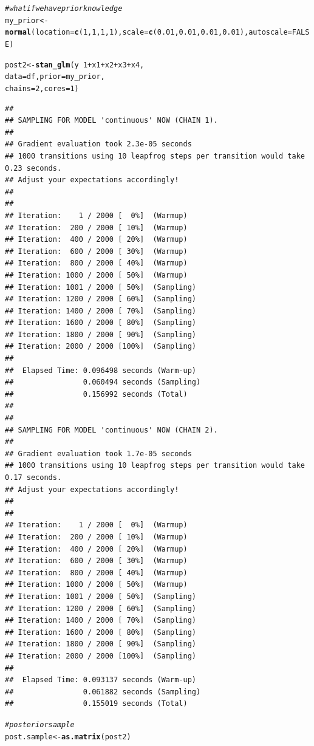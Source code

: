 \documentclass[11pt,a4paper,twoside]{book}\usepackage[]{graphicx}\usepackage[]{color}
\makeatletter
\newcommand{\hlnum}[1]{\textcolor[rgb]{0.686,0.059,0.569}{#1}}%
\newcommand{\hlcom}[1]{\textcolor[rgb]{0.678,0.584,0.686}{\textit{#1}}}%
\newcommand{\hlopt}[1]{\textcolor[rgb]{0,0,0}{#1}}%
\newcommand{\hlstd}[1]{\textcolor[rgb]{0.345,0.345,0.345}{#1}}%
\newcommand{\hlkwb}[1]{\textcolor[rgb]{0.69,0.353,0.396}{#1}}%
\newcommand{\hlkwc}[1]{\textcolor[rgb]{0.333,0.667,0.333}{#1}}%
\newcommand{\hlkwd}[1]{\textcolor[rgb]{0.737,0.353,0.396}{\textbf{#1}}}%
\newenvironment{kframe}{%
 \def\at@end@of@kframe{}%
 \ifinner\ifhmode%
  \def\at@end@of@kframe{\end{minipage}}%
  \begin{minipage}{\columnwidth}%
 \fi\fi%
 \def\FrameCommand##1{\hskip\@totalleftmargin \hskip-\fboxsep
 \colorbox{shadecolor}{##1}\hskip-\fboxsep
     \hskip-\linewidth \hskip-\@totalleftmargin \hskip\columnwidth}%
 \MakeFramed {\advance\hsize-\width
   \@totalleftmargin\z@ \linewidth\hsize
   \@setminipage}}%
 {\par\unskip\endMakeFramed%
 \at@end@of@kframe}
\newenvironment{knitrout}{}{} %
\makeatother
\begin{document}
\begin{knitrout}
\begin{kframe}
\begin{alltt}
\hlcom{#what if we have prior knowledge}
\hlstd{my_prior} \hlkwb{<-} \hlkwd{normal}\hlstd{(}\hlkwc{location} \hlstd{=} \hlkwd{c}\hlstd{(}\hlnum{1}\hlstd{,} \hlnum{1}\hlstd{,}\hlnum{1}\hlstd{,}\hlnum{1}\hlstd{),} \hlkwc{scale} \hlstd{=} \hlkwd{c}\hlstd{(}\hlnum{0.01}\hlstd{,} \hlnum{0.01}\hlstd{,}\hlnum{0.01}\hlstd{,}\hlnum{0.01}\hlstd{),} \hlkwc{autoscale} \hlstd{=} \hlnum{FALSE}\hlstd{)}

\hlstd{post2} \hlkwb{<-} \hlkwd{stan_glm}\hlstd{(y} \hlopt{~} \hlnum{1} \hlopt{+} \hlstd{x1} \hlopt{+} \hlstd{x2} \hlopt{+} \hlstd{x3} \hlopt{+} \hlstd{x4,}
                  \hlkwc{data} \hlstd{= df,} \hlkwc{prior} \hlstd{= my_prior,}
                  \hlkwc{chains} \hlstd{=} \hlnum{2}\hlstd{,} \hlkwc{cores} \hlstd{=} \hlnum{1}\hlstd{)}
\end{alltt}
\begin{verbatim}
## 
## SAMPLING FOR MODEL 'continuous' NOW (CHAIN 1).
## 
## Gradient evaluation took 2.3e-05 seconds
## 1000 transitions using 10 leapfrog steps per transition would take 0.23 seconds.
## Adjust your expectations accordingly!
## 
## 
## Iteration:    1 / 2000 [  0%]  (Warmup)
## Iteration:  200 / 2000 [ 10%]  (Warmup)
## Iteration:  400 / 2000 [ 20%]  (Warmup)
## Iteration:  600 / 2000 [ 30%]  (Warmup)
## Iteration:  800 / 2000 [ 40%]  (Warmup)
## Iteration: 1000 / 2000 [ 50%]  (Warmup)
## Iteration: 1001 / 2000 [ 50%]  (Sampling)
## Iteration: 1200 / 2000 [ 60%]  (Sampling)
## Iteration: 1400 / 2000 [ 70%]  (Sampling)
## Iteration: 1600 / 2000 [ 80%]  (Sampling)
## Iteration: 1800 / 2000 [ 90%]  (Sampling)
## Iteration: 2000 / 2000 [100%]  (Sampling)
## 
##  Elapsed Time: 0.096498 seconds (Warm-up)
##                0.060494 seconds (Sampling)
##                0.156992 seconds (Total)
## 
## 
## SAMPLING FOR MODEL 'continuous' NOW (CHAIN 2).
## 
## Gradient evaluation took 1.7e-05 seconds
## 1000 transitions using 10 leapfrog steps per transition would take 0.17 seconds.
## Adjust your expectations accordingly!
## 
## 
## Iteration:    1 / 2000 [  0%]  (Warmup)
## Iteration:  200 / 2000 [ 10%]  (Warmup)
## Iteration:  400 / 2000 [ 20%]  (Warmup)
## Iteration:  600 / 2000 [ 30%]  (Warmup)
## Iteration:  800 / 2000 [ 40%]  (Warmup)
## Iteration: 1000 / 2000 [ 50%]  (Warmup)
## Iteration: 1001 / 2000 [ 50%]  (Sampling)
## Iteration: 1200 / 2000 [ 60%]  (Sampling)
## Iteration: 1400 / 2000 [ 70%]  (Sampling)
## Iteration: 1600 / 2000 [ 80%]  (Sampling)
## Iteration: 1800 / 2000 [ 90%]  (Sampling)
## Iteration: 2000 / 2000 [100%]  (Sampling)
## 
##  Elapsed Time: 0.093137 seconds (Warm-up)
##                0.061882 seconds (Sampling)
##                0.155019 seconds (Total)
\end{verbatim}
\begin{alltt}
\hlcom{#posterior sample}
\hlstd{post.sample} \hlkwb{<-} \hlkwd{as.matrix}\hlstd{(post2)}


\end{alltt}
\end{kframe}
\end{knitrout}
\end{document}
